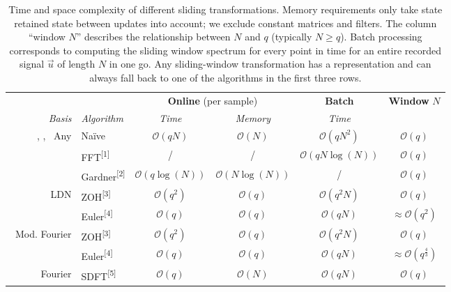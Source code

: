 \begin{table}[p]
	\caption[Time and space complexity of different sliding transformations]{Time and space complexity of different sliding transformations.
	Memory requirements only take state retained state between updates into account; we exclude constant matrices and filters.
	The column \enquote{window $N$} describes the relationship between $N$ and $q$ (typically $N \geq q$).
	Batch processing corresponds to computing the sliding window spectrum for every point in time for an entire recorded signal $\vec u$ of length $N$ in one go.
	Any sliding-window transformation has a \FIR representation and can always fall back to one of the algorithms in the first three rows.
	}
	\label{tbl:time_comparison}
	\small\sffamily
	{
	\centering
	\setlength{\tabcolsep}{8.75pt}
	\begin{tabular}{r l c c c c}
		\toprule
		& & \multicolumn{2}{c}{\textbf{Online} (per sample)} & \multicolumn{1}{c}{\textbf{Batch}} & \textbf{Window} $N$ \\
		\cmidrule(r){3-4}\cmidrule(r){5-5}\cmidrule{6-6}
		\emph{Basis} & \emph{Algorithm} & \emph{Time} & \emph{Memory} & \emph{Time} & \\
		\midrule
		\symLTI, \symSDT, \symFIR~Any & Na\"ive & $\mathcal{O}(qN)$ & $\mathcal{O}(N)$ & $\mathcal{O}(qN^2)$ & $\mathcal{O}(q)$ \\
		\cmidrule{2-6}
		    & FFT\textsuperscript{[1]} & / & / & $\mathcal{O}(qN \log(N))$ & $\mathcal{O}(q)$  \\
		\cmidrule{2-6}
		    & Gardner\textsuperscript{[2]} & $\mathcal{O}(q \log(N))$ & $\mathcal{O}(N \log(N))$ & / & $\mathcal{O}(q)$ \\
		\midrule
		\symLTI~LDN &
			ZOH\textsuperscript{[3]} & $\mathcal{O}(q^2)$ & $\mathcal{O}(q)$ & $\mathcal{O}(q^2 N)$ & $\mathcal{O}(q)$ \\
		\cmidrule{2-6}
		& Euler\textsuperscript{[4]} & $\mathcal{O}(q)$ & $\mathcal{O}(q)$ & $\mathcal{O}(qN)$ & $\approx \mathcal{O}(q^2)$ \\
		\midrule
		\symLTI~Mod. Fourier &
			ZOH\textsuperscript{[3]} & $\mathcal{O}(q^2)$ & $\mathcal{O}(q)$ & $\mathcal{O}(q^2N)$ & $\mathcal{O}(q)$ \\
		\cmidrule{2-6}
		& Euler\textsuperscript{[4]} & $\mathcal{O}(q)$ & $\mathcal{O}(q)$ & $\mathcal{O}(qN)$ & $\approx \mathcal{O}(q^{\frac{4}3})$ \\
		\midrule
		\symSDT~Fourier & SDFT\textsuperscript{[5]} & $\mathcal{O}(q)$ & $\mathcal{O}(N)$ & $\mathcal{O}(qN)$ & $\mathcal{O}(q)$ \\

\end{tabular}}
\end{table}
